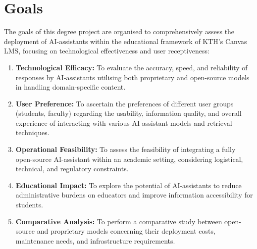 \section{Goals}
\label{sec:goals}




The goals of this degree project are organised to comprehensively assess the deployment of AI-assistants within the educational framework of KTH's Canvas LMS, focusing on technological effectiveness and user receptiveness:

\begin{enumerate}
	\item \textbf{Technological Efficacy:} To evaluate the accuracy, speed, and reliability of responses by AI-assistants utilising both proprietary and open-source models in handling domain-specific content.
	\item \textbf{User Preference:} To ascertain the preferences of different user groups (students, faculty) regarding the usability, information quality, and overall experience of interacting with various AI-assistant models and retrieval techniques.
	\item \textbf{Operational Feasibility:} To assess the feasibility of integrating a fully open-source AI-assistant within an academic setting, considering logistical, technical, and regulatory constraints.
	\item \textbf{Educational Impact:} To explore the potential of AI-assistants to reduce administrative burdens on educators and improve information accessibility for students.
	\item \textbf{Comparative Analysis:} To perform a comparative study between open-source and proprietary models concerning their deployment costs, maintenance needs, and infrastructure requirements.
\end{enumerate}


